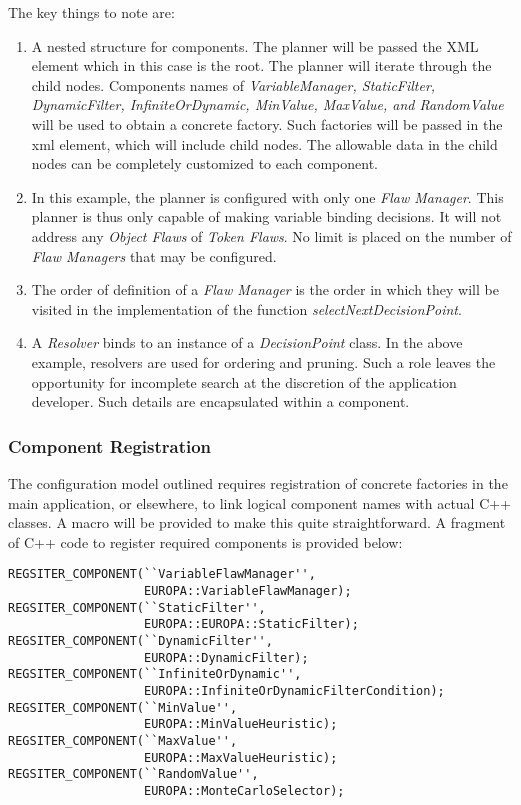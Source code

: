 \documentclass[10pt, letterpaper, oneside]{article}
\begin{document}
The key things to note are:
\begin{enumerate}
\item A nested structure for components. The planner will be passed the XML element which in this case is the root. The planner will iterate through the child nodes. Components names of {\em VariableManager, StaticFilter, DynamicFilter, InfiniteOrDynamic, MinValue, MaxValue, and RandomValue} will be used to obtain a concrete factory. Such factories will be passed in the xml element, which will include child nodes. The allowable data in the child nodes can be completely customized to each component.
\item In this example, the planner is configured with only one {\em Flaw Manager}. This planner is thus only capable of making variable binding decisions. It will not address any {\em Object Flaws} of {\em Token Flaws}. No limit is placed on the number of {\em Flaw Managers} that may be configured.
\item The order of definition of a {\em Flaw Manager} is the order in which they will be visited in the implementation of the function {\em selectNextDecisionPoint}.
\item A {\em Resolver} binds to an instance of a {\em DecisionPoint} class. In the above example, resolvers are used for ordering and pruning. Such a role leaves the opportunity for incomplete search at the discretion of the application developer. Such details are encapsulated within a component.
\end{enumerate}

\subsubsection{Component Registration}
The configuration model outlined requires registration of concrete factories in the main application, or elsewhere, to link logical component names with actual C++ classes. A macro will be provided to make this quite straightforward. A fragment of C++ code to register required components is provided below:

\begin{verbatim}
REGSITER_COMPONENT(``VariableFlawManager'', 
                   EUROPA::VariableFlawManager);
REGSITER_COMPONENT(``StaticFilter'', 
                   EUROPA::EUROPA::StaticFilter);
REGSITER_COMPONENT(``DynamicFilter'', 
                   EUROPA::DynamicFilter);
REGSITER_COMPONENT(``InfiniteOrDynamic'', 
                   EUROPA::InfiniteOrDynamicFilterCondition);
REGSITER_COMPONENT(``MinValue'', 
                   EUROPA::MinValueHeuristic);
REGSITER_COMPONENT(``MaxValue'', 
                   EUROPA::MaxValueHeuristic);
REGSITER_COMPONENT(``RandomValue'', 
                   EUROPA::MonteCarloSelector);
\end{verbatim}
\end{document}

